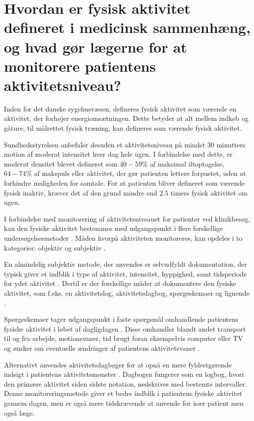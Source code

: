 \section{Hvordan er fysisk aktivitet defineret i medicinsk sammenhæng, og hvad gør lægerne for at monitorere patientens aktivitetsniveau?}

Inden for det danske sygehusvæsen, defineres fysisk aktivitet som værende en aktivitet, der forhøjer energiomsætningen. 
Dette betyder at alt mellem indkøb og gåture, til målrettet fysisk træning, kan defineres som værende fysisk aktivitet.\citep{gupta2013, terkelsen2015}

Sundhedsstyrelsen anbefaler desuden et aktivitetsniveau på mindst 30 minutters motion af moderat intensitet hver dag hele ugen. 
I forbindelse med dette, er moderat densitet blevet defineret som $40-59\%$ af maksimal iltoptagelse, $64-74\%$ af makspuls eller aktivitet, der gør patienten lettere forpustet, uden at forhindre muligheden for samtale. 
For at patienten bliver defineret som værende fysisk inaktiv, kræver det af den grund mindre end $2.5$ timers fysisk aktivitet om ugen.\citep{gupta2013}

I forbindelse med monitorering af aktivitetsniveauet for patienter ved klinikbesøg, kan den fysiske aktivitet bestemmes med udgangspunkt i flere forskellige undersøgelsesmetoder \citep{gupta2013}. 
Måden hvorpå aktiviteten monitoreres, kan opdeles i to kategorier: objektiv og subjektiv \citep{gupta2013, adamo2009}. 


En almindelig subjektiv metode, der anvendes er selvudfyldt dokumentation, der typisk giver et indblik i type af aktivitet, intensitet, hyppighed, samt tidsperiode for ydet aktivitet \citep{adamo2009}. Dertil er der forskellige måder at dokumentere den fysiske aktivitet, som f.eks. en aktivitetslog, aktivitetsdagbog, spørgeskemaer og lignende \citep{adamo2009}. 


Spørgeskemaer tager udgangspunkt i faste spørgsmål omhandlende patientens fysiske aktivitet i løbet af dagligdagen \citep{muller2009}. 
Disse omhandler blandt andet transport til og fra arbejde, motionsvaner, tid brugt foran eksempelvis computer eller TV og ønsker om eventuelle ændringer af patientens aktivitetsvaner \citep{gupta2013, vestergaard2012}. 

Alternativt anvendes aktivitetsdagbøger \citep{muller2009} for at opnå en mere fyldestgørende indsigt i patientens aktivitetsmønster \citep{gupta2013}. 
Dagbogen fungerer som en logbog, hvori den primære aktivitet siden sidste notation, nedskrives med bestemte intervaller. 
Denne monitoreringsmetode giver et bedre indblik i patientens fysiske aktivitet gennem dagen, men er også mere tidskrævende at anvende for især patient men også læge.\citep{gupta2013}

